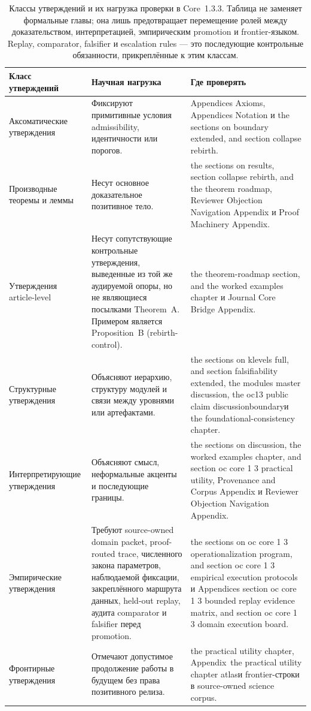 \begin{table}[htbp]
\centering
\begingroup
\footnotesize
\RaggedRight
\setlength{\tabcolsep}{4pt}
\begin{tabular}{@{}L{0.21\textwidth}L{0.28\textwidth}L{0.39\textwidth}@{}}
\toprule
\textbf{Класс утверждений} & \textbf{Научная нагрузка} & \textbf{Где проверять} \\
\midrule
Аксоматические утверждения & Фиксируют примитивные условия admissibility, идентичности или порогов. & Appendices Axioms, Appendices Notation и the sections on boundary extended, and section collapse rebirth. \\
Производные теоремы и леммы & Несут основное доказательное позитивное тело. & the sections on results, section collapse rebirth, and the theorem roadmap, Reviewer Objection Navigation Appendix и Proof Machinery Appendix. \\
Утверждения article-level & Несут сопутствующие контрольные утверждения, выведенные из той же аудируемой опоры, но не являющиеся посылками Theorem~A. Примером является Proposition~B (rebirth-control). & the theorem-roadmap section, and the worked examples chapter и Journal Core Bridge Appendix. \\
Структурные утверждения & Объясняют иерархию, структуру модулей и связи между уровнями или артефактами. & the sections on klevels full, and section falsifiability extended, the modules master discussion, the oc13 public claim discussionboundaryи the foundational-consistency chapter. \\
Интерпретирующие утверждения & Объясняют смысл, неформальные акценты и последующие границы. & the sections on discussion, the worked examples chapter, and section oc core 1 3 practical utility, Provenance and Corpus Appendix и Reviewer Objection Navigation Appendix. \\
Эмпирические утверждения & Требуют source-owned domain packet, proof-routed trace, численного закона параметров, наблюдаемой фиксации, закреплённого маршрута данных, held-out replay, аудита comparator и falsifier перед promotion. & the sections on oc core 1 3 operationalization program, and section oc core 1 3 empirical execution protocols и Appendices section oc core 1 3 bounded replay evidence matrix, and section oc core 1 3 domain execution board. \\
Фронтирные утверждения & Отмечают допустимое продолжение работы в будущем без права позитивного релиза. & the practical utility chapter, Appendix~the practical utility chapter atlasи frontier-строки в source-owned science corpus. \\
\bottomrule
\end{tabular}
\endgroup
\caption{Классы утверждений и их нагрузка проверки в Core~1.3.3. Таблица не заменяет формальные главы; она лишь предотвращает перемещение ролей между доказательством, интерпретацией, эмпирическим promotion и frontier-языком. Replay, comparator, falsifier и escalation rules — это последующие контрольные обязанности, прикреплённые к этим классам.}
\label{tab:oc13-statement-classes}
\end{table}

